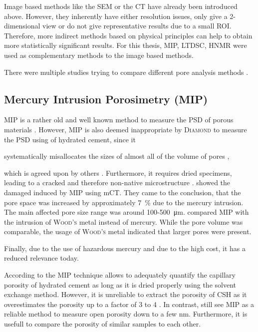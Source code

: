 Image based methods like the \ac{SEM} or the \ac{CT} have already been introduced above.
However, they inherently have either resolution issues, only give a 2-dimensional view or do not give representative results due to a small \ac{ROI}.
Therefore, more indirect methods based on physical principles can help to obtain more statistically significant results.
For this thesis, \ac{MIP}, \ac{LTDSC}, \ac{HNMR} were used as complementary methods to the image based methods.

{\color{red} There were multiple studies trying to compare different pore analysis methods \cite{naber.2020,georget.2024}.} %


\subsection{Mercury Intrusion Porosimetry (\acs{MIP})}
\label{sec:mip}
\ac{MIP} is a rather old and well known method to measure the \ac{PSD} of porous materials \cite{romberg.1978}.
However, \ac{MIP} is also deemed inappropriate by \textsc{Diamond} to measure the \ac{PSD} using of hydrated cement, since it
\begin{iquote}
	systematically misallocates the sizes of almost all of the volume of pores \cite{diamond.2000},
\end{iquote}
which is agreed upon by others \cite{chatterji.2001,giesche.2002}.
Furthermore, it requires dried specimens, leading to a cracked and therefore non-native microstructure \cite{chatterji.2001,wang.2019}.
\textcite{wang.2019} showed the damaged induced by \ac{MIP} using \ac{mCT}.
They came to the conclusion, that the pore space was increased by approximately \SI{7}{\percent} due to the mercury intrusion.
The main affected pore size range was around 100-\SI{500}{\micro\meter}.
\textcite{abell.1999} compared \ac{MIP} with the intrusion of \textsc{Wood's} metal instead of mercury.
While the pore volume was comparable, the usage of \textsc{Wood's} metal indicated that larger pores were present.

Finally, due to the use of hazardous mercury and due to the high cost, it has a reduced relevance today.

According to \textcite{muller.2014} the \ac{MIP} technique allows to adequately quantify the capillary porosity of hydrated cement as long as it is dried properly using the solvent exchange method.
However, it is unreliable to extract the porosity of \ac{CSH} as it overestimates the porosity up to a factor of \num{3} to \num{4} \cite{muller.2014}.
In contrast, \textcite{georget.2024} still see \ac{MIP} as a reliable method to measure open porosity down to a few \si{\nano\meter}.
Furthermore, it is usefull to compare the porosity of similar samples to each other.

